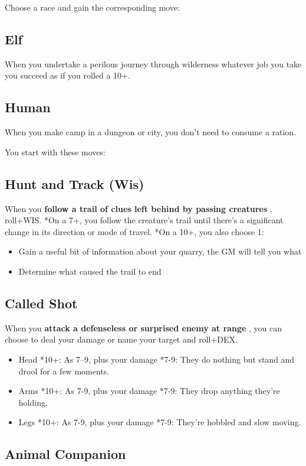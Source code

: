  Choose a race and gain the corresponding move:
\subsection{Elf}


 When you undertake a perilous journey through wilderness whatever job you take you succeed as if you rolled a 10+.
\subsection{Human}


 When you make camp in a dungeon or city, you don't need to consume a ration.


 You start with these moves:
\subsection{Hunt and Track (Wis)}


 When you \textbf{follow a trail of clues left behind by passing creatures}
, roll+WIS. *On a 7+, you follow the creature's trail until there's a significant change in its direction or mode of travel. *On a 10+, you also choose 1:
\begin{itemize}
\item Gain a useful bit of information about your quarry, the GM will tell you what
\item Determine what caused the trail to end

\end{itemize}
\subsection{Called Shot}


 When you \textbf{attack a defenseless or surprised enemy at range}
, you can choose to deal your damage or name your target and roll+DEX.
\begin{itemize}
\item Head *10+: As 7--9, plus your damage *7-9: They do nothing but stand and drool for a few moments.
\item Arms *10+: As 7-9, plus your damage *7-9: They drop anything they're holding.
\item Legs *10+: As 7-9, plus your damage *7-9: They're hobbled and slow moving.

\end{itemize}
\subsection{Animal Companion}


